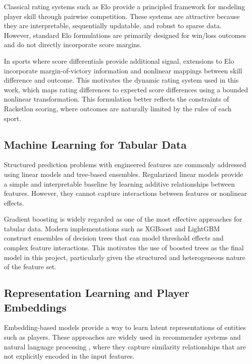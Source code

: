 \documentclass[10pt,twocolumn]{article}
\begin{document}
Classical rating systems such as Elo \citep{elo1978} provide a principled framework for modeling player skill through pairwise competition. These systems are attractive because they are interpretable, sequentially updatable, and robust to sparse data. However, standard Elo formulations are primarily designed for win/loss outcomes and do not directly incorporate score margins.

In sports where score differentials provide additional signal, extensions to Elo incorporate margin-of-victory information and nonlinear mappings between skill difference and outcome. This motivates the dynamic rating system used in this work, which maps rating differences to expected score differences using a bounded nonlinear transformation. This formulation better reflects the constraints of Racketlon scoring, where outcomes are naturally limited by the rules of each sport.

\subsection{Machine Learning for Tabular Data}

Structured prediction problems with engineered features are commonly addressed using linear models and tree-based ensembles. Regularized linear models provide a simple and interpretable baseline by learning additive relationships between features. However, they cannot capture interactions between features or nonlinear effects.

Gradient boosting \citep{friedman2001} is widely regarded as one of the most effective approaches for tabular data. Modern implementations such as XGBoost \citep{chen2016xgboost} and LightGBM \citep{ke2017lightgbm} construct ensembles of decision trees that can model threshold effects and complex feature interactions. This motivates the use of boosted trees as the final model in this project, particularly given the structured and heterogeneous nature of the feature set.

\subsection{Representation Learning and Player Embeddings}

Embedding-based models provide a way to learn latent representations of entities such as players. These approaches are widely used in recommender systems and natural language processing \citep{koren2009matrix, mikolov2013word2vec}, where they capture similarity relationships that are not explicitly encoded in the input features.
\end{document}
